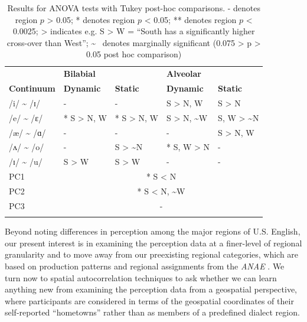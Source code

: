 \documentclass[output=paper]{LSP/langsci}
\begin{document}
\begin{table}
\begin{tabular}{lllll}
\lsptoprule 
& {\bfseries Bilabial} &  & {\bfseries Alveolar} & \\
\cmidrule(lr){2-3}\cmidrule(lr){4-5}
{\bfseries Continuum} & {\bfseries Dynamic} & {\bfseries Static} & {\bfseries Dynamic} & {\bfseries Static}\\
\midrule
{\mdseries /i/ {\textasciitilde} /ɪ/} & {\mdseries {}-} & {\mdseries {}-} & {\mdseries * S {\textgreater} N, W} & {\mdseries * S {\textgreater} N}\\
{\mdseries /e/ {\textasciitilde} /ɛ/ } & {\mdseries ** S {\textgreater} N, W} & {\mdseries ** S {\textgreater} N, W} & {\mdseries * S {\textgreater} N, {\textasciitilde}W} & {\mdseries * S, W {\textgreater} {\textasciitilde}N}\\
{\mdseries /æ/ {\textasciitilde} /ɑ/ } & {\mdseries {}-} & {\mdseries {}-} & {\mdseries {}-} & {\mdseries * S {\textgreater} N, W}\\
{\mdseries  /ʌ/ {\textasciitilde} /o/} & {\mdseries {}-} & {\mdseries * S {\textgreater} {\textasciitilde}N} & {\mdseries ** S, W {\textgreater} N} & {\mdseries {}-}\\
{\mdseries /ɪ/ {\textasciitilde} /u/} & {\mdseries * S {\textgreater} W} & {\mdseries * S {\textgreater} W} & {\mdseries {}-} & {\mdseries {}-}\\
\midrule
{\mdseries PC1} & \multicolumn{4}{c}{ * S {\textless} N\par}\\
{\mdseries PC2} & \multicolumn{4}{c}{ * S {\textless} N, {\textasciitilde}W\par}\\
{\mdseries PC3} & \multicolumn{4}{c}{ {}-\par}\\
\lspbottomrule
\end{tabular}
\caption{Results for ANOVA tests with Tukey post-hoc comparisons. - denotes region $p$ {\textgreater} 0.05; * denotes region $p$ {\textless} 0.05; ** denotes region $p$ {\textless} 0.0025; {\textgreater} indicates e.g. S {\textgreater} W = “South has a significantly higher cross-over than West”; {\textasciitilde} ~denotes marginally significant (0.075 {\textgreater} p {\textgreater} 0.05 post hoc comparison)}
\label{tab:1}
\end{table}

Beyond noting differences in perception among the major regions of U.S. English, our present interest is in examining the perception data at a finer-level of regional granularity and to move away from our preexisting regional categories, which are based on production patterns and regional assignments from the \textit{ANAE} \citep{labov_atlas_2006-1}. We turn now to spatial autocorrelation techniques to ask whether we can learn anything new from examining the perception data from a geospatial perspective, where participants are considered in terms of the geospatial coordinates of their self-reported “hometowns” rather than as members of a predefined dialect region. 
\end{document}
